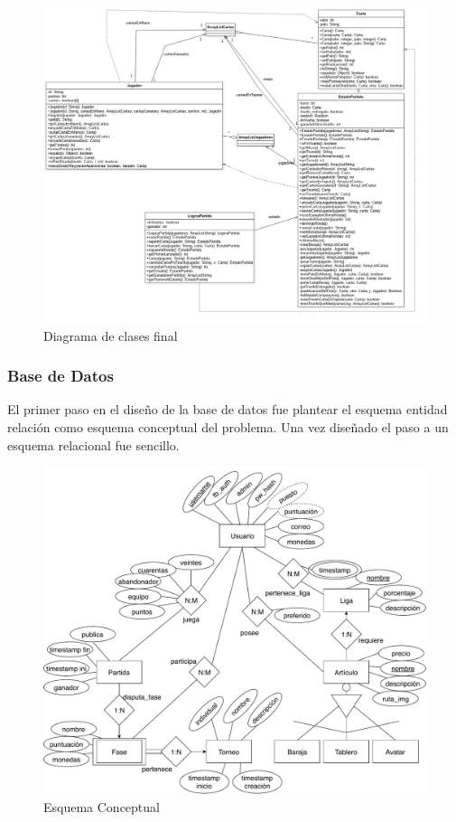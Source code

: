 \begin{figure}[H]
\centering
\includegraphics[scale = 0.5]{figuras/logica_juego/diagramaClasesImplementacion.png}
\caption{Diagrama de clases final}
\label{fig:diagramaClasesLogicaJuegoFinal}
\end{figure}


\subsubsection{Base de Datos}
El primer paso en el diseño de la base de datos fue plantear el esquema entidad relación como esquema conceptual del problema. Una vez diseñado el paso a un esquema relacional fue sencillo.

\begin{figure}[H]
\centering
\includegraphics[scale = 0.5]{figuras/base_datos/diagrama-conceptual.pdf}
\caption{Esquema Conceptual}
\label{fig:diagramaConceptual}
\end{figure}

